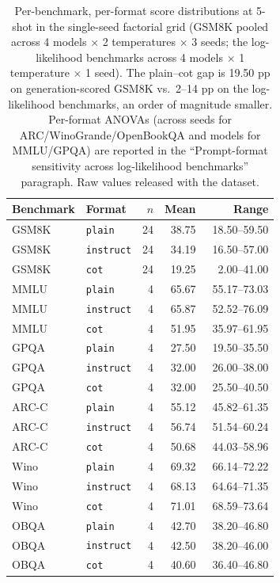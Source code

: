 \documentclass[11pt]{article}
\begin{document}
\begin{table}[h]
\centering
\small
\begin{tabular}{llrrr}
\toprule
Benchmark & Format & $n$ & Mean & Range \\
\midrule
GSM8K & \texttt{plain}    & 24 & 38.75 & 18.50--59.50 \\
GSM8K & \texttt{instruct} & 24 & 34.19 & 16.50--57.00 \\
GSM8K & \texttt{cot}      & 24 & 19.25 & ~~2.00--41.00 \\
\midrule
MMLU  & \texttt{plain}    &  4 & 65.67 & 55.17--73.03 \\
MMLU  & \texttt{instruct} &  4 & 65.87 & 52.52--76.09 \\
MMLU  & \texttt{cot}      &  4 & 51.95 & 35.97--61.95 \\
\midrule
GPQA  & \texttt{plain}    &  4 & 27.50 & 19.50--35.50 \\
GPQA  & \texttt{instruct} &  4 & 32.00 & 26.00--38.00 \\
GPQA  & \texttt{cot}      &  4 & 32.00 & 25.50--40.50 \\
ARC-C & \texttt{plain}    &  4 & 55.12 & 45.82--61.35 \\
ARC-C & \texttt{instruct} &  4 & 56.74 & 51.54--60.24 \\
ARC-C & \texttt{cot}      &  4 & 50.68 & 44.03--58.96 \\
Wino  & \texttt{plain}    &  4 & 69.32 & 66.14--72.22 \\
Wino  & \texttt{instruct} &  4 & 68.13 & 64.64--71.35 \\
Wino  & \texttt{cot}      &  4 & 71.01 & 68.59--73.64 \\
OBQA  & \texttt{plain}    &  4 & 42.70 & 38.20--46.80 \\
OBQA  & \texttt{instruct} &  4 & 42.50 & 38.20--46.00 \\
OBQA  & \texttt{cot}      &  4 & 40.60 & 36.40--46.80 \\
\bottomrule
\end{tabular}
\caption{Per-benchmark, per-format score distributions at 5-shot in the single-seed
factorial grid (GSM8K pooled across 4 models $\times$ 2 temperatures $\times$ 3
seeds; the log-likelihood benchmarks across 4 models $\times$ 1 temperature
$\times$ 1 seed). The plain--cot gap is 19.50 pp on generation-scored GSM8K vs.\
2--14 pp on the log-likelihood benchmarks, an order of magnitude smaller. Per-format
ANOVAs (across seeds for ARC/WinoGrande/OpenBookQA and models for MMLU/GPQA) are
reported in the ``Prompt-format sensitivity across log-likelihood benchmarks''
paragraph. Raw values released with the dataset.}
\label{tab:anova-per-benchmark}
\end{table}
\end{document}
